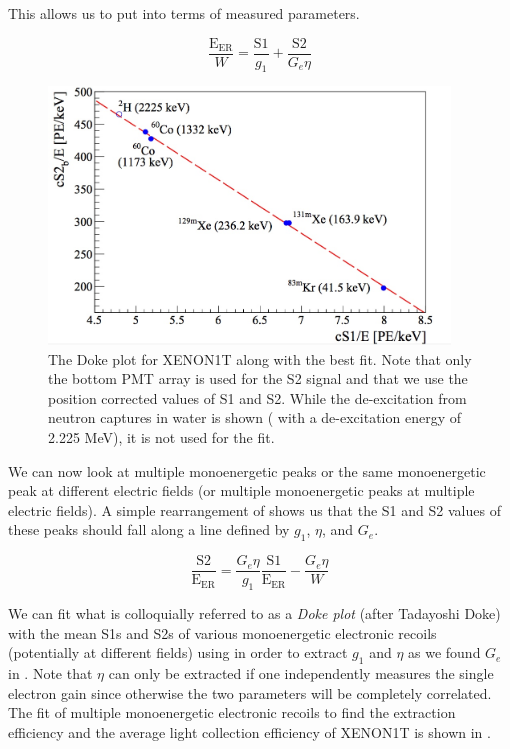   This allows us to put  into terms of measured parameters.
  
\begin{equation}
        \label{eqn:xe1t_anticorrelation_s1_s2}
        \frac{\textrm{E}_{\textrm{ER}}}{W} = \frac{\textrm{S1}}{g_1} + \frac{\textrm{S2}}{G_e \eta}
\end{equation}
 
  \begin{figure}[t]
	\centering
	\includegraphics[width=0.95\textwidth]{xe1t_doke_plot}
	\caption{The Doke plot for XENON1T along with the best fit.  Note that only the bottom PMT array is used for the S2 signal and that we use the position corrected values of S1 and S2.  While the de-excitation from neutron captures in water is shown ( with a de-excitation energy of 2.225 MeV), it is not used for the fit.}
	\label{fig:xe1t_doke_plot}
\end{figure}

 
We can now look at multiple monoenergetic peaks or the same monoenergetic peak at different electric fields (or multiple monoenergetic peaks at multiple electric fields).  A simple rearrangement of  shows us that the S1 and S2 values of these peaks should fall along a line defined by $g_1$, $\eta$, and $G_e$.

 \begin{equation}
        \label{eqn:xe1t_anticorrelation_line}
        \frac{\textrm{S2}}{\textrm{E}_{\textrm{ER}}} = \frac{G_e \eta}{g_1} \frac{\textrm{S1}}{\textrm{E}_{\textrm{ER}}} - \frac{G_e \eta}{W}
\end{equation}
 
 We can fit what is colloquially referred to as a \textit{Doke plot} (after Tadayoshi Doke) with the mean S1s and S2s of various monoenergetic electronic recoils (potentially at different fields) using  in order to extract $g_1$ and $\eta$ as we found $G_e$ in .  Note that $\eta$ can only be extracted if one independently measures the single electron gain since otherwise the two parameters will be completely correlated.  The fit of multiple monoenergetic electronic recoils to find the extraction efficiency and the average light collection efficiency of XENON1T is shown in . 
 
